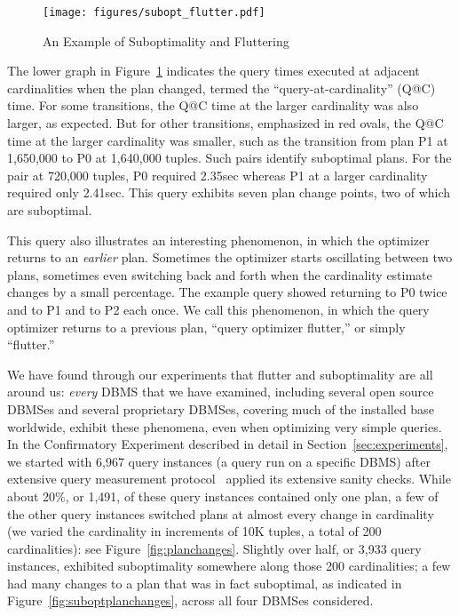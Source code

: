 \documentclass[prodmode,acmtods]{acmsmall}
\begin{document}
\begin{figure}[t]
\centering
\texttt{[image: figures/subopt\_flutter.pdf]}
\caption{An Example of Suboptimality and Fluttering\label{fig:query769}}
\end{figure}

The lower graph in Figure~\ref{fig:query769} indicates the query times
executed at adjacent cardinalities when the plan changed, termed the
``query-at-cardinality'' (Q@C) time. For some transitions, the Q@C time at
the larger cardinality was also larger, as expected. But for other
transitions, emphasized in red ovals, the Q@C time at the larger cardinality
was smaller, such as the transition from plan P1 at 1,650,000 to P0 at 1,640,000
tuples. Such pairs identify suboptimal plans. For the pair at 720,000
tuples, P0 required 2.35sec whereas P1 at a larger cardinality required only
2.41sec. This query exhibits seven plan change points, two of which are suboptimal.

This query also illustrates an interesting phenomenon, in which the
optimizer returns to an {\em earlier} plan. Sometimes the
optimizer starts oscillating between two plans, sometimes even switching
back and forth when the cardinality estimate changes by a small
percentage. The example query showed returning to P0 twice and to P1 and to
P2 each once.
We call this phenomenon, in which
the query optimizer returns to a previous plan,
``query optimizer flutter,'' or simply ``flutter.'' 

We have found through our experiments that flutter and suboptimality are all
around us: {\em every} \hbox{DBMS} that we have examined, including several
open source \hbox{DBMSes} and several proprietary
\hbox{DBMSes}, covering much of the installed base worldwide, exhibit these
phenomena, even when optimizing very simple queries. In the Confirmatory
Experiment described in detail in Section~\ref{sec:experiments}, we started
with 6,967 query instances (a query run on a specific \hbox{DBMS}) after  extensive query measurement
protocol~\cite{TTPv1,TTPv2} applied its extensive sanity checks. While about
20\%, or 1,491, of these query instances contained only one
plan, a few of the other query instances switched plans at almost every change in cardinality (we varied the
cardinality in increments of 10K tuples, a total of 200 cardinalities): see
Figure~\ref{fig:planchanges}. Slightly over half, or 3,933 query instances, exhibited
suboptimality somewhere along those 200 cardinalities; a few had
many changes to a plan that was in fact suboptimal, as indicated in
Figure~\ref{fig:suboptplanchanges}, across all four \hbox{DBMSes} considered.
\end{document}
